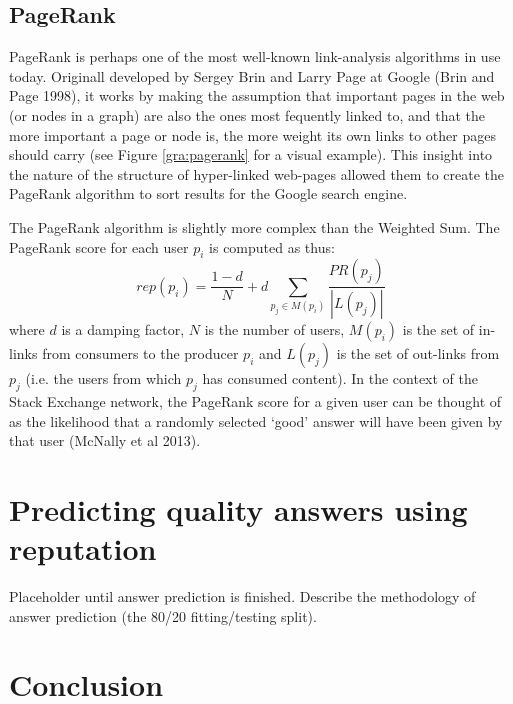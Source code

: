\documentclass[]{final_report}
\begin{document}

\subsection{PageRank}

PageRank is perhaps one of the most well-known link-analysis algorithms in use today. Originall developed by Sergey Brin and Larry Page at Google (Brin and Page 1998), it works by making the assumption that important pages in the web (or nodes in a graph) are also the ones most fequently linked to, and that the more important a page or node is, the more weight its own links to other pages should carry (see Figure \ref{gra:pagerank} for a visual example). This insight into the nature of the structure of hyper-linked web-pages allowed them to create the PageRank algorithm to sort results for the Google search engine.

The PageRank algorithm is slightly more complex than the Weighted Sum. The PageRank score for each user $p_{i}$ is computed as thus:
\[
rep(p_{i}) = \frac{1 - d}{N} + d \sum_{p_{j} \in M(p_{i})} \frac{PR(p_{j})}{|L(p_{j})|}
\]
where $d$ is a damping factor, $N$ is the number of users, $M(p_{i})$ is the set of in-links from consumers to the producer $p_{i}$ and $L(p_{j})$ is the set of out-links from $p_{j}$ (i.e. the users from which $p_{j}$ has consumed content). In the context of the Stack Exchange network, the PageRank score for a given user can be thought of as the likelihood that a randomly selected `good' answer will have been given by that user (McNally et al 2013).

\section{Predicting quality answers using reputation}

Placeholder until answer prediction is finished. Describe the methodology of answer prediction (the 80/20 fitting/testing split).

\section{Conclusion}
\end{document}
